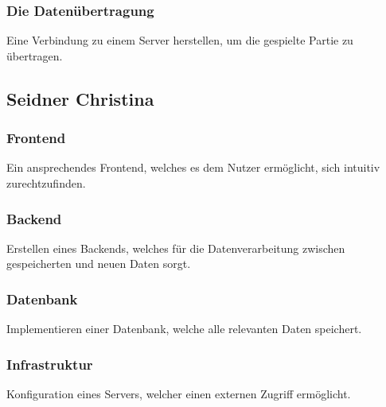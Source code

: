 \subsubsection{Die Datenübertragung}
Eine Verbindung zu einem Server herstellen, um die gespielte Partie zu übertragen.


\subsection{Seidner Christina}

\subsubsection{Frontend}
Ein ansprechendes Frontend, welches es dem Nutzer ermöglicht, sich intuitiv zurechtzufinden.

\subsubsection{Backend}
Erstellen eines Backends, welches für die Datenverarbeitung zwischen gespeicherten und neuen Daten sorgt.

\subsubsection{Datenbank}
Implementieren einer Datenbank, welche alle relevanten Daten speichert.

\subsubsection{Infrastruktur}
Konfiguration eines Servers, welcher einen externen Zugriff ermöglicht.
